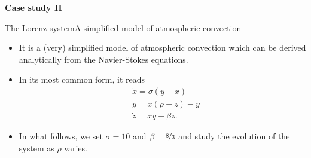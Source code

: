\documentclass[usenames,dvipsnames,svgnames,10pt,aspectratio=169]{beamer}
\begin{document}
\begin{frame}[t, c]{}{}
	\centering

	{\Large \textbf{Case study II}}

	\bigskip


	\vspace{-2cm}
\end{frame}

\begin{frame}[t, c]{The Lorenz system}{A simplified model of atmospheric convection}
	\begin{minipage}{.58\textwidth}
		\begin{itemize}
			\item It is a (very) simplified model of atmospheric convection which can be derived analytically from the Navier-Stokes equations.

			\bigskip

			\item In its most common form, it reads
			\[
				\begin{aligned}
					& \dot{x} = \sigma ( y - x ) \\
					& \dot{y} = x (\rho - z) - y \\
					& \dot{z} = xy - \beta z.
				\end{aligned}
			\]

			\medskip

			\item In what follows, we set \( \sigma = 10 \) and \( \beta = \nicefrac{8}{3} \) and study the evolution of the system as \( \rho \) varies.
		\end{itemize}
	\end{minipage}%
	\hfill
	\begin{minipage}{.38\textwidth}
		\centering
	\end{minipage}


\end{frame}
\end{document}
